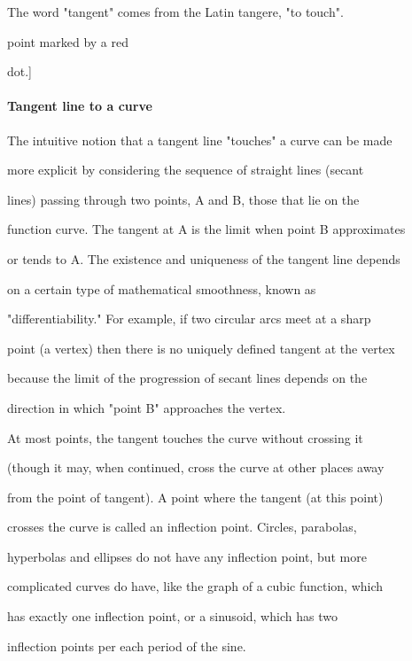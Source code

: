 The word "tangent" comes from the Latin tangere, "to touch".




point marked by a red

dot.]



\paragraph{Tangent line to a curve}



The intuitive notion that a tangent line "touches" a curve can be made

more explicit by considering the sequence of straight lines (secant

lines) passing through two points, A and B, those that lie on the

function curve. The tangent at A is the limit when point B approximates

or tends to A. The existence and uniqueness of the tangent line depends

on a certain type of mathematical smoothness, known as

"differentiability." For example, if two circular arcs meet at a sharp

point (a vertex) then there is no uniquely defined tangent at the vertex

because the limit of the progression of secant lines depends on the

direction in which "point B" approaches the vertex.



At most points, the tangent touches the curve without crossing it

(though it may, when continued, cross the curve at other places away

from the point of tangent). A point where the tangent (at this point)

crosses the curve is called an inflection point. Circles, parabolas,

hyperbolas and ellipses do not have any inflection point, but more

complicated curves do have, like the graph of a cubic function, which

has exactly one inflection point, or a sinusoid, which has two

inflection points per each period of the sine.



